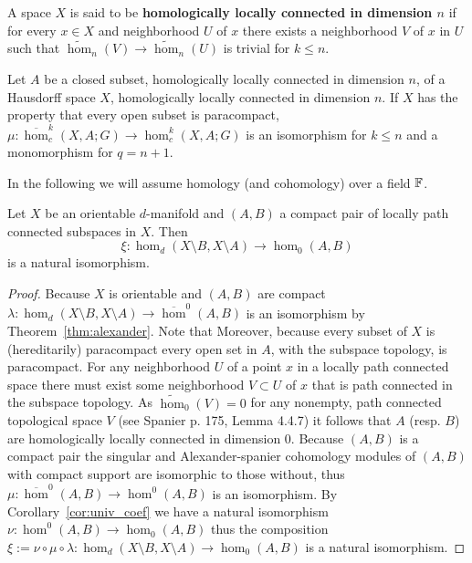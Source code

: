 A space $X$ is said to be \textbf{homologically locally connected in dimension $n$} if for every $x\in X$ and neighborhood $U$ of $x$ there exists a neighborhood $V$ of $x$ in $U$ such that $\tilde{\hom}_n(V)\to\tilde{\hom}_n(U)$ is trivial for $k\leq n$.

\begin{lemma}\label{lem:alexander_iso}
  Let $A$ be a closed subset, homologically locally connected in dimension $n$, of a Hausdorff space $X$, homologically locally connected in dimension $n$.
  If $X$ has the property that every open subset is paracompact, $\mu : \overline{\hom}_c^k(X,A; G)\to \hom_c^k(X, A; G)$ is an isomorphism for $k\leq n$ and a monomorphism for $q = n+1$.
\end{lemma}

In the following we will assume homology (and cohomology) over a field $\mathbb{F}$.

\begin{lemma}\label{cor:alexander_iso}
  Let $X$ be an orientable $d$-manifold and $(A,B)$ a compact pair of locally path connected subspaces in $X$.
  Then
  \[\xi : \hom_d(X\setminus B, X\setminus  A)\to \hom_0(A, B)\]
  is a natural isomorphism.
\end{lemma}
\begin{proof}
  Because $X$ is orientable and $(A,B)$ are compact $\lambda : \hom_d(X\setminus B, X\setminus A)\to \overline{\hom}^{0}(A, B)$ is an isomorphism by Theorem~\ref{thm:alexander}.
  Note that
  Moreover, because every subset of $X$ is (hereditarily) paracompact every open set in $A$, with the subspace topology, is paracompact.
  For any neighborhood $U$ of a point $x$ in a locally path connected space there must exist some neighborhood $V\subset U$ of $x$ that is path connected in the subspace topology.
  As $\tilde{\hom}_0(V) = 0$ for any nonempty, path connected topological space $V$ (see Spanier p. 175, Lemma 4.4.7) it follows that $A$ (resp. $B$) are homologically locally connected in dimension $0$.
  Because $(A,B)$ is a compact pair the singular and Alexander-spanier cohomology modules of $(A,B)$ with compact support are isomorphic to those without, thus $\mu:\overline{\hom}^{0}(A, B)\to \hom^0(A, B)$ is an isomorphism.
  By Corollary~\ref{cor:univ_coef} we have a natural isomorphism $\nu : \hom^0(A, B)\to\hom_0(A, B)$ thus the composition $\xi := \nu\circ\mu\circ\lambda : \hom_d(X\setminus B, X\setminus  A)\to \hom_0(A, B)$ is a natural isomorphism.
\end{proof}


